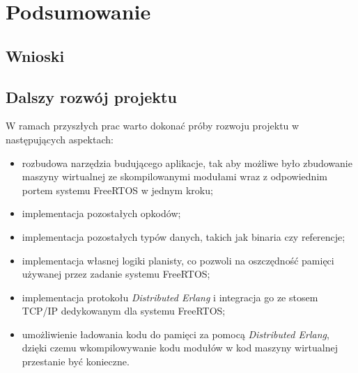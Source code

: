 \chapter{Podsumowanie}
\label{cha:podsumowanie}

\section{Wnioski}
\label{sec:podsumowanieWnioski}

\section{Dalszy rozwój projektu}
\label{sec:podsumowanieDalszy}

W ramach przyszłych prac warto dokonać próby rozwoju projektu w następujących aspektach:

\begin{itemize}
\item rozbudowa narzędzia budującego aplikacje, tak aby możliwe było zbudowanie maszyny wirtualnej ze skompilowanymi modułami wraz z odpowiednim portem systemu FreeRTOS w jednym kroku;
\item implementacja pozostałych opkodów;
\item implementacja pozostałych typów danych, takich jak binaria czy referencje;
\item implementacja własnej logiki planisty, co pozwoli na oszczędność pamięci używanej przez zadanie systemu FreeRTOS;
\item implementacja protokołu \emph{Distributed Erlang} \cite{DistributedErlang} i integracja go ze stosem TCP/IP dedykowanym dla systemu FreeRTOS;
\item umożliwienie ładowania kodu do pamięci za pomocą \emph{Distributed Erlang}, dzięki czemu wkompilowywanie kodu modułów w kod maszyny wirtualnej przestanie być konieczne.
\end{itemize}
